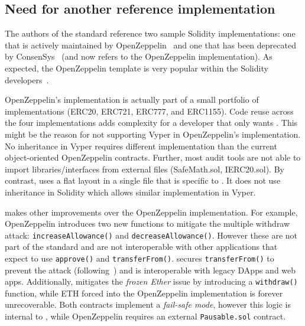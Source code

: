 
	
\subsection{Need for another reference implementation}
The authors of the \erc standard reference two sample Solidity implementations: one that is actively maintained by OpenZeppelin~\cite{OpenZepplin} and one that has been deprecated by ConsenSys~\cite{ConsensysToken} (and now refers to the OpenZeppelin implementation). As expected, the OpenZeppelin template is very popular within the Solidity developers~\cite{OPZ1,OPZ2,OPZ3}.

OpenZeppelin's implementation is actually part of a small portfolio of implementations (ERC20, ERC721, ERC777, and ERC1155). Code reuse across the four implementations adds complexity for a developer that only wants \erc. This might be the reason for not supporting Vyper in OpenZeppelin's implementation. No inheritance in Vyper requires different implementation than the current object-oriented OpenZeppelin contracts. Further, most audit tools are not able to import libraries/interfaces from external files (\eg SafeMath.sol, IERC20.sol). By contrast, \sys uses a flat layout in a single file that is specific to \erc. It does not use inheritance in Solidity which allows similar implementation in Vyper.  


\sys makes other improvements over the OpenZeppelin implementation. For example, OpenZeppelin introduces two new functions to mitigate the multiple withdraw attack: \texttt{increaseAllowance()} and \texttt{decreaseAllowance()}. However these are not part of the \erc standard and are not  interoperable with other applications that expect to use \texttt{approve()} and \texttt{transferFrom()}. \sys secures \texttt{transferFrom()} to prevent the attack (following~\cite{ERC20MWA}) and is interoperable with legacy DApps and web apps. Additionally, \sys mitigates the \textit{frozen Ether} issue by introducing a \texttt{withdraw()} function, while ETH forced into the OpenZeppelin implementation is forever unrecoverable. Both contracts implement a \textit{fail-safe mode}, however this logic is internal to \sys, while OpenZeppelin requires an external \texttt{Pausable.sol} contract.

